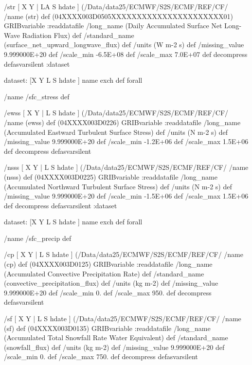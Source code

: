\begin{ingrid}
{/str { [ X Y | LA S hdate ] (/Data/data25/ECMWF/S2S/ECMF/REF/CF/%
/name (str) def
(04XXXX003D0505XXXXXXXXXXXXXXXXXXXXXX01) GRIBvariable
:readdatafile
/long_name (Daily Accumulated Surface Net Long-Wave Radiation Flux) def
/standard_name (surface_net_upward_longwave_flux) def
/units (W m-2 s) def
/missing_value 9.999000E+20 def
/scale_min -6.5E+08 def
/scale_max 7.0E+07 def
decompress
} defasvarsilent
:dataset

dataset:
[X Y L S hdate ] {name exch def } forall

/name /sfc_stress def

/ewss { [ X Y | L S hdate ] (/Data/data25/ECMWF/S2S/ECMF/REF/CF/%
/name (ewss) def
(04XXXX003D0226) GRIBvariable
:readdatafile
/long_name (Accumulated Eastward Turbulent Surface Stress) def
/units (N m-2 s) def
/missing_value 9.999000E+20 def
/scale_min -1.2E+06 def
/scale_max 1.5E+06 def
decompress
} defasvarsilent

/nsss { [ X Y | L S hdate ] (/Data/data25/ECMWF/S2S/ECMF/REF/CF/%
/name (nsss) def
(04XXXX003D0225) GRIBvariable
:readdatafile
/long_name (Accumulated Northward Turbulent Surface Stress) def
/units (N m-2 s) def
/missing_value 9.999000E+20 def
/scale_min -1.5E+06 def
/scale_max 1.5E+06 def
decompress
} defasvarsilent
:dataset

dataset:
[X Y L S hdate ] {name exch def } forall

/name /sfc_precip def

/cp { [ X Y | L S hdate ] (/Data/data25/ECMWF/S2S/ECMF/REF/CF/%
/name (cp) def
(04XXXX003D0125) GRIBvariable
:readdatafile
/long_name (Accumulated Convective Precipitation Rate) def
/standard_name (convective_precipitation_flux) def
/units (kg m-2) def
/missing_value 9.999000E+20 def
/scale_min 0. def
/scale_max 950. def
decompress
} defasvarsilent

/sf { [ X Y | L S hdate ] (/Data/data25/ECMWF/S2S/ECMF/REF/CF/%
/name (sf) def
(04XXXX003D0135) GRIBvariable
:readdatafile
/long_name (Accumulated Total Snowfall Rate Water Equivalent) def
/standard_name (snowfall_flux) def
/units (kg m-2) def
/missing_value 9.999000E+20 def
/scale_min 0. def
/scale_max 750. def
decompress
} defasvarsilent

}
\end{ingrid}
